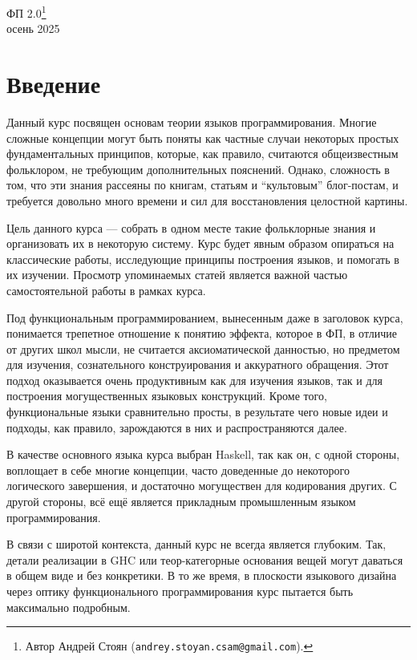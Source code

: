 \documentclass[12pt]{article}
\begin{document}
    \begin{center}
    {\LARGE ФП 2.0}\footnote{Автор Андрей Стоян (\texttt{andrey.stoyan.csam@gmail.com}).}
        \\
        осень 2025
    \end{center}

    \tableofcontents

    \newpage

    \section*{Введение}

    Данный курс посвящен основам теории языков программирования.
    Многие сложные концепции могут быть поняты как частные случаи некоторых простых фундаментальных принципов, которые, как правило, считаются общеизвестным фольклором, не требующим дополнительных пояснений.
    Однако, сложность в том, что эти знания рассеяны по книгам, статьям и ``культовым'' блог-постам, и требуется довольно много времени и сил для восстановления целостной картины.

    Цель данного курса --- собрать в одном месте такие фольклорные знания и организовать их в некоторую систему.
    Курс будет явным образом опираться на классические работы, исследующие принципы построения языков, и помогать в их изучении.
    Просмотр упоминаемых статей является важной частью самостоятельной работы в рамках курса.

    Под функциональным программированием, вынесенным даже в заголовок курса, понимается трепетное отношение к понятию эффекта, которое в ФП, в отличие от других школ мысли, не считается аксиоматической данностью, но предметом для изучения, сознательного конструирования и аккуратного обращения.
    Этот подход оказывается очень продуктивным как для изучения языков, так и для построения могущественных языковых конструкций. %
    Кроме того, функциональные языки сравнительно просты, в результате чего новые идеи и подходы, как правило, зарождаются в них и распространяются далее.

    В качестве основного языка курса выбран Haskell, так как он, с одной стороны, воплощает в себе многие концепции, часто доведенные до некоторого логического завершения, и достаточно могуществен для кодирования других.
    С другой стороны, всё ещё является прикладным промышленным языком программирования.

    В связи с широтой контекста, данный курс не всегда является глубоким.
    Так, детали реализации в GHC или теор-категорные основания вещей могут даваться в общем виде и без конкретики.
    В то же время, в плоскости языкового дизайна через оптику функционального программирования курс пытается быть максимально подробным.
\end{document}
